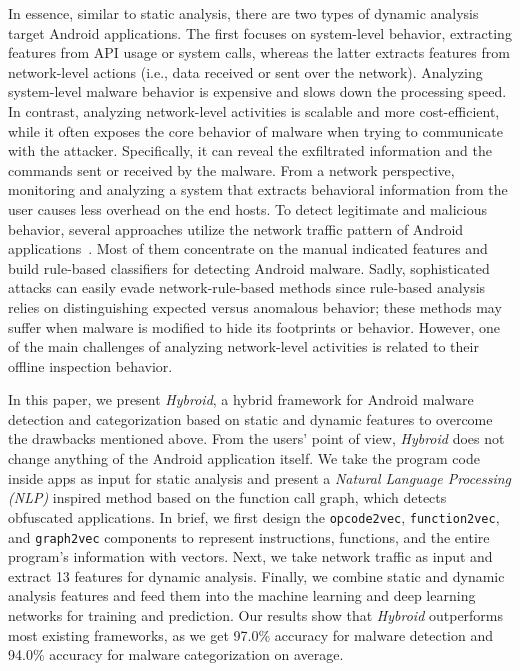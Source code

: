 \documentclass[runningheads]{llncs}
\newcommand{\toolname}{\textit{Hybroid}\xspace}
\newcommand{\netfeatures}{{13}\xspace}
\begin{document}
In essence, similar to static analysis, there are two types of dynamic analysis target Android applications. The first focuses on system-level behavior, extracting features from API usage or system calls, whereas the latter extracts features from network-level actions (i.e., data received or sent over the network). Analyzing system-level malware behavior is expensive and slows down the processing speed. In contrast, analyzing network-level activities is scalable and more cost-efficient, while it often exposes the core behavior of malware when trying to communicate with the attacker. Specifically, it can reveal the exfiltrated information and the commands sent or received by the malware. From a network perspective, monitoring and analyzing a system that extracts behavioral information from the user causes less overhead on the end hosts. To detect legitimate and malicious behavior, several approaches utilize the network traffic pattern of Android applications~\cite{malik2016credroid,arora2014malware,zulkifli2018android,marin2020deepmal,wang2017malware}. Most of them concentrate on the manual indicated features and build rule-based classifiers for detecting Android malware. Sadly, sophisticated attacks can easily evade network-rule-based methods since rule-based analysis relies on distinguishing expected versus anomalous behavior; these methods may suffer when malware is modified to hide its footprints or behavior. However, one of the main challenges of analyzing network-level activities is related to their offline inspection behavior.

In this paper, we present \toolname, a hybrid framework for Android malware detection and categorization based on static and dynamic features to overcome the drawbacks mentioned above. From the users' point of view, \toolname does not change anything of the Android application itself. We take the program code inside apps as input for static analysis and present a \textit{Natural Language Processing (NLP)} inspired method based on the function call graph, which detects obfuscated applications. In brief, we first design the \texttt{opcode2vec}, \texttt{function2vec}, and \texttt{graph2vec} components to represent instructions, functions, and the entire program's information with vectors. Next, we take network traffic as input and extract \netfeatures features for dynamic analysis. Finally, we combine static and dynamic analysis features and feed them into the machine learning and deep learning networks for training and prediction. Our results show that \toolname outperforms most existing frameworks, as we get 97.0\% accuracy for malware detection and 94.0\% accuracy for malware categorization on average.
\end{document}
